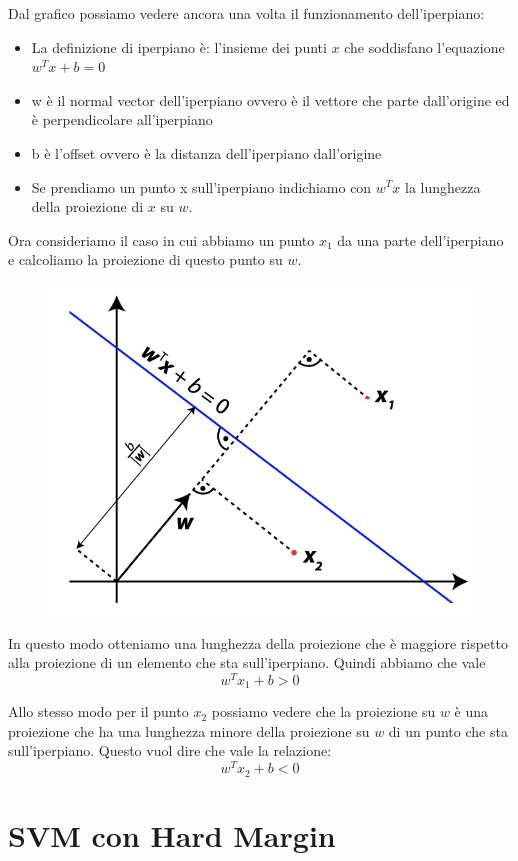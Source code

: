 \documentclass[14pt]{extreport}
\begin{document}
Dal grafico possiamo vedere ancora una volta il funzionamento dell'iperpiano:
\begin{itemize}
	\item La definizione di iperpiano è: l'insieme dei punti $x$ che soddisfano l'equazione $w^Tx+b=0$
	\item w è il normal vector dell'iperpiano ovvero è il vettore che parte dall'origine ed è perpendicolare all'iperpiano
	\item b è l'offset ovvero è la distanza dell'iperpiano dall'origine
	\item Se prendiamo un punto x sull'iperpiano indichiamo con $w^Tx$ la lunghezza della proiezione di $x$ su $w$.
\end{itemize}

Ora consideriamo il caso in cui abbiamo un punto $x_1$ da una parte dell'iperpiano e calcoliamo la proiezione di questo punto su $w$.

\begin{figure}[H]
	\centering
	\includegraphics[width=0.7\linewidth]{313.jpeg}
\end{figure}

In questo modo otteniamo una lunghezza della proiezione che è maggiore rispetto alla proiezione di un elemento che sta sull'iperpiano. Quindi abbiamo
che vale $$w^Tx_1+b > 0$$

Allo stesso modo per il punto $x_2$ possiamo vedere che la proiezione su $w$ è una proiezione che ha una lunghezza minore della proiezione su $w$ di
un punto che sta sull'iperpiano. Questo vuol dire che vale la relazione: $$w^Tx_2+b<0$$

\section{SVM con Hard Margin}
\end{document}
